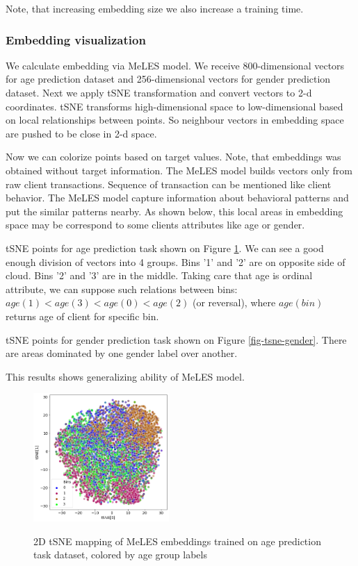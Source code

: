 \documentclass[sigconf, anonymous]{acmart}
\begin{document}
Note, that increasing embedding size we also increase a training time.


\subsubsection{Embedding visualization}

We calculate embedding via MeLES model. We receive 800-dimensional vectors for age prediction dataset and 256-dimensional vectors for gender prediction dataset. Next we apply tSNE transformation and convert vectors to 2-d coordinates. tSNE transforms high-dimensional space to low-dimensional based on local relationships between points. So neighbour vectors in embedding space are pushed to be close in 2-d space.

Now we can colorize points based on target values. Note, that embeddings was obtained without target information. The MeLES model builds vectors only from raw client transactions. Sequence of transaction can be mentioned like client behavior. The MeLES model capture information about behavioral patterns and put the similar patterns nearby. As shown below, this local areas in embedding space may be correspond to some clients attributes like age or gender.

tSNE points for age prediction task shown on Figure \ref{fig-tsne-age}. We can see a good enough division of vectors into 4 groups. Bins '1' and '2' are on opposite side of cloud. Bins '2' and '3' are in the middle. Taking care that age is ordinal attribute, we can suppose such relations between bins: $age(1) < age(3) < age(0) < age(2)$ (or reversal), where $age(bin)$ returns age of client for specific bin.

tSNE points for gender prediction task shown on Figure \ref{fig-tsne-gender}. There are areas dominated by one gender label over another.

This results shows generalizing ability of MeLES model.

\begin{figure}[ht]
  \caption{2D tSNE mapping of MeLES embeddings trained on age prediction task dataset, colored by age group labels}
  \includegraphics[width=0.46\textwidth]{figures/age-pred-tsne.png}
  \label{fig-tsne-age}
\end{figure}
\end{document}
